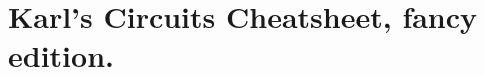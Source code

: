 \documentclass[letterpaper]{scrreprt}
\begin{document}
\chapter{Karl's Circuits Cheatsheet, fancy edition.}
\end{document}
